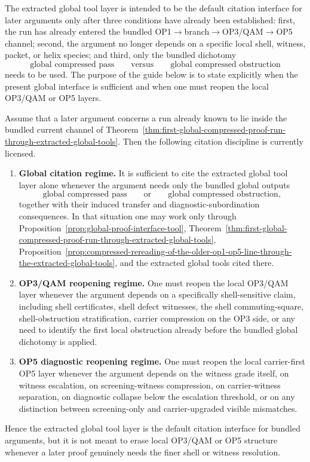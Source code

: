 \begin{remark}
The extracted global tool layer is intended to be the default citation interface for later arguments only after three conditions have already been established: first, the run has already entered the bundled OP1$\to$branch$\to$OP3/QAM$\to$OP5 channel; second, the argument no longer depends on a specific local shell, witness, packet, or helix species; and third, only the bundled dichotomy
\[
\text{global compressed pass}
\qquad\text{versus}\qquad
\text{global compressed obstruction}
\]
needs to be used. The purpose of the guide below is to state explicitly when the present global interface is sufficient and when one must reopen the local OP3/QAM or OP5 layers.
\end{remark}

\begin{proposition}
\label{prop:first-global-tool-citation-guide}
Assume that a later argument concerns a run already known to lie inside the bundled current channel of Theorem~\ref{thm:first-global-compressed-proof-run-through-extracted-global-tools}. Then the following citation discipline is currently licensed.
\begin{enumerate}[leftmargin=2em,label=(\roman*)]
\item \textbf{Global citation regime.}
It is sufficient to cite the extracted global tool layer alone whenever the argument needs only the bundled global outputs
\[
\text{global compressed pass}
\qquad\text{or}\qquad
\text{global compressed obstruction},
\]
together with their induced transfer and diagnostic-subordination consequences. In that situation one may work only through Proposition~\ref{prop:global-proof-interface-tool}, Theorem~\ref{thm:first-global-compressed-proof-run-through-extracted-global-tools}, Proposition~\ref{prop:compressed-rereading-of-the-older-op1-op5-line-through-the-extracted-global-tools}, and the extracted global tools cited there.
\item \textbf{OP3/QAM reopening regime.}
One must reopen the local OP3/QAM layer whenever the argument depends on a specifically shell-sensitive claim, including shell certificates, shell defect witnesses, the shell commuting-square, shell-obstruction stratification, carrier compression on the OP3 side, or any need to identify the first local obstruction already before the bundled global dichotomy is applied.
\item \textbf{OP5 diagnostic reopening regime.}
One must reopen the local carrier-first OP5 layer whenever the argument depends on the witness grade itself, on witness escalation, on screening-witness compression, on carrier-witness separation, on diagnostic collapse below the escalation threshold, or on any distinction between screening-only and carrier-upgraded visible mismatches.
\end{enumerate}
Hence the extracted global tool layer is the default citation interface for bundled arguments, but it is not meant to erase local OP3/QAM or OP5 structure whenever a later proof genuinely needs the finer shell or witness resolution.
\end{proposition}


